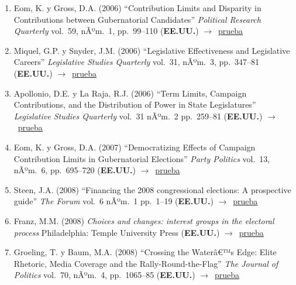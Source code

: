 \documentclass[12 pt, letter]{article}
\newenvironment{CitasMiTrabajo}{
    \begin{footnotesize}
    \begin{enumerate}[label={\footnotesize\emph{cita~\arabic*}},ref=\arabic*] %
        \setlength{\itemsep}{.1\itemsep}
        \setlength{\parskip}{.1\parskip}
    }{\end{enumerate}\end{footnotesize}}
\begin{document}
\begin{CitasMiTrabajo}
        \item Eom, K. y Gross, D.A. (2006)
        ``Contribution Limits and Disparity in Contributions between
        Gubernatorial Candidates'' \emph{Political Research Quarterly} vol.\ 59, nÃºm.\
        1, pp.\ 99--110  (\textbf{EE.UU.}) $\rightarrow$~\href{http://ericmagar.com/cv/cites/coxMagar/eom1.pdf}{prueba}

        \item Miquel, G.P. y Snyder, J.M. (2006)
        ``Legislative
        Effectiveness and Legislative Careers'' \emph{Legislative Studies
        Quarterly} vol.\ 31, nÃºm.\ 3, pp.\ 347--81 (\textbf{EE.UU.}) $\rightarrow$~\href{http://ericmagar.com/cv/cites/coxMagar/padro.pdf}{prueba}

       \item Apollonio, D.E. y La Raja, R.J. (2006) ``Term Limits, Campaign Contributions, and the Distribution of Power in State Legislatures'' \emph{Legislative Studies Quarterly} vol.\ 31 nÃºm.\ 2 pp.\ 259--81 (\textbf{EE.UU.}) $\rightarrow$~\href{http://ericmagar.com/cv/cites/coxMagar/apollonio+laraja2006lsq.pdf}{prueba}

        \item Eom, K. y Gross, D.A. (2007)
        ``Democratizing Effects of Campaign Contribution Limits in Gubernatorial Elections'' \emph{Party Politics} vol.\ 13, nÃºm.\ 6, pp.\ 695--720
        (\textbf{EE.UU.}) $\rightarrow$~\href{http://ericmagar.com/cv/cites/coxMagar/eom2.pdf}{prueba}

       \item Steen, J.A. (2008) ``Financing the 2008 congressional elections: A prospective guide'' \emph{The Forum} vol.\ 6 nÃºm.\ 1 pp.\ 1--19 (\textbf{EE.UU.}) $\rightarrow$~\href{http://ericmagar.com/cv/cites/coxMagar/steen2008.pdf}{prueba}

        \item Franz, M.M. (2008)
        \emph{Choices and changes:
        interest groups in the electoral process}
        Philadelphia: Temple University Press (\textbf{EE.UU.}) $\rightarrow$~\href{http://ericmagar.com/cv/cites/coxMagar/franz.pdf}{prueba}

        \item Groeling, T. y Baum, M.A. (2008)
        ``Crossing the Waterâ€™s Edge: Elite Rhetoric,
        Media Coverage and the Rally-Round-the-Flag'' \emph{The Journal of Politics} vol.\ 70,
        nÃºm.\ 4, pp.\ 1065--85 (\textbf{EE.UU.}) $\rightarrow$~\href{http://ericmagar.com/cv/cites/coxMagar/groe.pdf}{prueba}


\end{CitasMiTrabajo}
\end{document}
